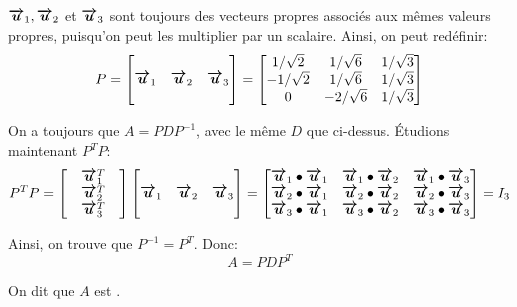 \documentclass[a4paper]{article}
\begin{document}
{    $\bvec{u}_1, \bvec{u}_2$ et $\bvec{u}_3$ sont toujours des vecteurs propres associés aux mêmes valeurs propres, puisqu'on peut les multiplier par un scalaire. Ainsi, on peut redéfinir: 
    \[P = \begin{bmatrix}  &  &  \\ \bvec{u}_1 & \bvec{u}_2 & \bvec{u}_3 \\  &  &  \end{bmatrix} = \begin{bmatrix} 1 / \sqrt{2} & 1 / \sqrt{6} & 1 / \sqrt{3} \\ -1 / \sqrt{2} & 1 / \sqrt{6} & 1 / \sqrt{3} \\ 0 & -2 / \sqrt{6} & 1 / \sqrt{3} \end{bmatrix} \]
    
    On a toujours que $A = PDP^{-1}$, avec le même $D$ que ci-dessus. Étudions maintenant $P^T P$: 
    \[P^T P = \begin{bmatrix}  & \bvec{u}_1^T &  \\  & \bvec{u}_2^T &  \\  & \bvec{u}_3^T &  \end{bmatrix} \begin{bmatrix}  &  &  \\ \bvec{u}_1 & \bvec{u}_2 & \bvec{u}_3 \\  &  &  \end{bmatrix} = \begin{bmatrix} \bvec{u}_1 \dotprod \bvec{u}_1 & \bvec{u}_1 \dotprod \bvec{u}_2 & \bvec{u}_1 \dotprod \bvec{u}_3 \\ \bvec{u}_2 \dotprod \bvec{u}_1 & \bvec{u}_2 \dotprod \bvec{u}_2 & \bvec{u}_2 \dotprod \bvec{u}_3 \\ \bvec{u}_3 \dotprod \bvec{u}_1 & \bvec{u}_3 \dotprod \bvec{u}_2  & \bvec{u}_3 \dotprod \bvec{u}_3\end{bmatrix} = I_3  \]
    
    Ainsi, on trouve que $P^{-1} = P^T$. Donc: 
    \[A = PDP^T\]

    On dit que $A$ est .

    }
\end{document}
